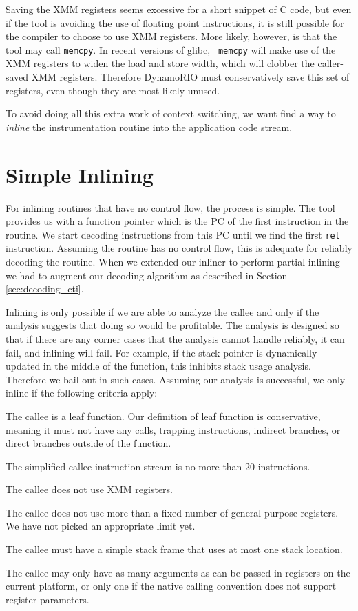 Saving the XMM registers seems excessive for a short snippet of C code, but even
if the tool is avoiding the use of floating point instructions, it is still
possible for the compiler to choose to use XMM registers.  More likely, however,
is that the tool may call {\tt memcpy}.  In recent versions of glibc, {\tt
memcpy} will make use of the XMM registers to widen the load and store width,
which will clobber the caller-saved XMM registers.  Therefore DynamoRIO must
conservatively save this set of registers, even though they are most likely
unused.

To avoid doing all this extra work of context switching, we want find a way to
{\em inline} the instrumentation routine into the application code stream.

\section{Simple Inlining}
\label{sec:simple_inlining}

For inlining routines that have no control flow, the process is simple.  The
tool provides us with a function pointer which is the PC of the first
instruction in the routine.  We start decoding instructions from this PC until
we find the first {\tt ret} instruction.  Assuming the routine has no control
flow, this is adequate for reliably decoding the routine.  When we extended our
inliner to perform partial inlining we had to augment our decoding algorithm as
described in Section \ref{sec:decoding_cti}.

Inlining is only possible if we are able to analyze the callee and only if the
analysis suggests that doing so would be profitable.  The analysis is designed
so that if there are any corner cases that the analysis cannot handle reliably,
it can fail, and inlining will fail.  For example, if the stack pointer is
dynamically updated in the middle of the function, this inhibits stack usage
analysis.  Therefore we bail out in such cases.  Assuming our analysis is
successful, we only inline if the following criteria apply:

\begin{packed_itemize}
\item The callee is a leaf function.  Our definition of leaf function is
conservative, meaning it must not have any calls, trapping instructions,
indirect branches, or direct branches outside of the function.
\item The simplified callee instruction stream is no more than 20 instructions.
\item The callee does not use XMM registers.
\item The callee does not use more than a fixed number of general purpose
registers.  We have not picked an appropriate limit yet.
\item The callee must have a simple stack frame that uses at most one stack
location.
\item The callee may only have as many arguments as can be passed in registers
on the current platform, or only one if the native calling convention does not
support register parameters.
\end{packed_itemize}

